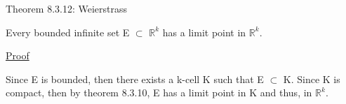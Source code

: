 { \color{red} Theorem 8.3.12: Weierstrass } 

	\begin{adjustbox}{minipage=14cm, right, vspace=0.1cm 0cm}
		Every bounded infinite set E $\subset$ $\mathbb{R}^k$ has
		a limit point in $\mathbb{R}^k$.
	\end{adjustbox}

{ \color{magenta} \underline{Proof} } 

	Since E is bounded, then there exists a k-cell K such that
	E $\subset$ K.
	Since K is compact, then by {\color{red} theorem 8.3.10},
	E has a limit point in K and thus, in $\mathbb{R}^k$.





